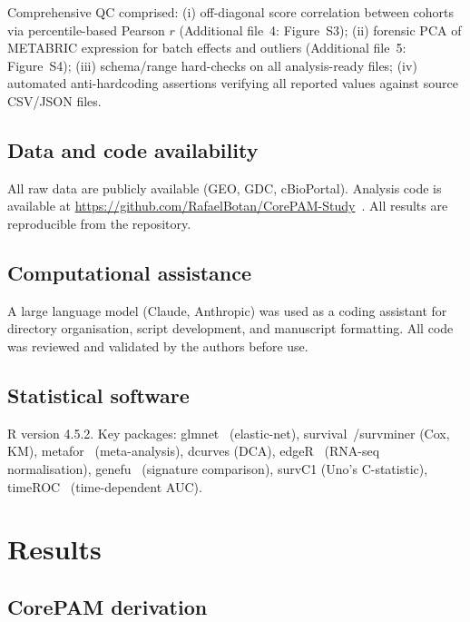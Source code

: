 \documentclass[referee,lineno,pdflatex,sn-vancouver-num]{sn-jnl}
\begin{document}
Comprehensive QC comprised: (i) off-diagonal score correlation between cohorts via percentile-based Pearson $r$ (Additional file~4: Figure~S3); (ii) forensic PCA of METABRIC expression for batch effects and outliers (Additional file~5: Figure~S4); (iii) schema/range hard-checks on all analysis-ready files; (iv) automated anti-hardcoding assertions verifying all reported values against source CSV/JSON files.

\subsection{Data and code availability}\label{subsec:data-code}

All raw data are publicly available (GEO, GDC, cBioPortal). Analysis code is available at \url{https://github.com/RafaelBotan/CorePAM-Study}~\cite{botan2026}. All results are reproducible from the repository.

\subsection{Computational assistance}\label{subsec:computational-assistance}

A large language model (Claude, Anthropic) was used as a coding assistant for directory organisation, script development, and manuscript formatting. All code was reviewed and validated by the authors before use.

\subsection{Statistical software}\label{subsec:statistical-software}

R version 4.5.2. Key packages: glmnet~\cite{friedman2010} (elastic-net), survival~\cite{therneau2000}/survminer (Cox, KM), metafor~\cite{viechtbauer2010} (meta-analysis), dcurves (DCA), edgeR~\cite{robinson2010} (RNA-seq normalisation), genefu~\cite{gendoo2016} (signature comparison), survC1 (Uno's C-statistic), timeROC~\cite{blanche2013} (time-dependent AUC).

\section{Results}\label{sec:results}

\subsection{CorePAM derivation}\label{subsec:results-derivation}
\end{document}
